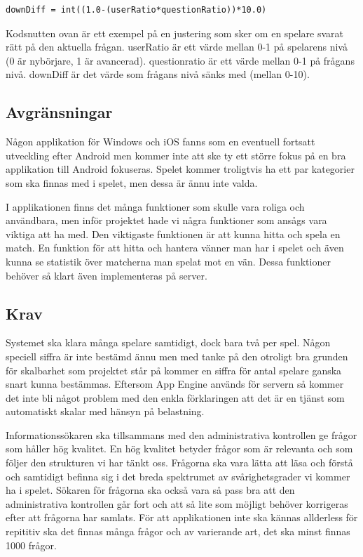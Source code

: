 \documentclass[12pt,a4paper]{article}
\begin{document}
\begin{verbatim}
downDiff = int((1.0-(userRatio*questionRatio))*10.0)
\end{verbatim}

Kodsnutten ovan är ett exempel på en justering som sker om en spelare svarat rätt på den aktuella frågan. userRatio är ett värde mellan 0-1 på spelarens nivå (0 är nybörjare, 1 är avancerad). questionratio är ett värde mellan 0-1 på frågans nivå. downDiff är det värde som frågans nivå sänks med (mellan 0-10). 

\subsection{Avgränsningar}
Någon applikation för Windows och iOS fanns som en eventuell fortsatt utveckling efter Android men kommer inte att ske ty ett större fokus på en bra applikation till Android fokuseras. Spelet kommer troligtvis ha ett par kategorier som ska finnas med i spelet, men dessa är ännu inte valda. 

I applikationen finns det många funktioner som skulle vara roliga och användbara, men inför projektet hade vi några funktioner som ansågs vara viktiga att ha med. Den viktigaste funktionen är att kunna hitta och spela en match. En funktion för att hitta och hantera vänner man har i spelet och även kunna se statistik över matcherna man spelat mot en vän. Dessa funktioner behöver så klart även implementeras på server.

\subsection{Krav}
Systemet ska klara många spelare samtidigt, dock bara två per spel. Någon speciell siffra är inte bestämd ännu men med tanke på den otroligt bra grunden för skalbarhet som projektet står på kommer en siffra för antal spelare ganska snart kunna bestämmas. Eftersom App Engine används för servern så kommer det inte bli något problem med den enkla förklaringen att det är en tjänst som automatiskt skalar med hänsyn på belastning. \cite{appenginescalability}

Informationssökaren ska tillsammans med den administrativa kontrollen ge frågor som håller hög kvalitet. En hög kvalitet betyder frågor som är relevanta och som följer den strukturen vi har tänkt oss. Frågorna ska vara lätta att läsa och förstå och samtidigt befinna sig i det breda spektrumet av svårighetsgrader vi kommer ha i spelet. Sökaren för frågorna ska också vara så pass bra att den administrativa kontrollen går fort och att så lite som möjligt behöver korrigeras efter att frågorna har samlats. För att applikationen inte ska kännas allderless för repititiv ska det finnas många frågor och av varierande art, det ska minst finnas 1000 frågor.
\end{document}
